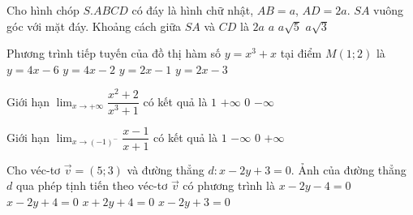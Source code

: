 \begin{ex}%
Cho hình chóp $S.ABCD$ có đáy là hình chữ nhật, $AB=a$, $AD=2a$. $SA$ vuông góc với mặt đáy. Khoảng cách giữa $SA$ và $CD$ là
\choice
{\True $2a$}
{$a$}
{$a\sqrt{5}$}
{$a\sqrt{3}$}
\end{ex}

\begin{ex}%
Phương trình tiếp tuyến của đồ thị hàm số $y=x^3+x$ tại điểm $M(1;2)$ là
\choice
{$y=4x-6$}
{\True $y=4x-2$}
{$y=2x-1$}
{$y=2x-3$}
\end{ex}

\begin{ex}%
Giới hạn $\displaystyle\lim_{x\to +\infty}\dfrac{x^2+2}{x^3+1}$ có kết quả là
\choice
{$1$}
{$+\infty$}
{\True $0$}
{$-\infty$}
\end{ex}

\begin{ex}%
Giới hạn $\displaystyle\lim_{x\to (-1)^-}\dfrac{x-1}{x+1}$ có kết quả là
\choice
{$1$}
{$-\infty$}
{$0$}
{\True $+\infty$}
\end{ex}

\begin{ex}%
Cho véc-tơ $\overrightarrow{v}=(5;3)$ và đường thẳng $d:x-2y+3=0$. Ảnh của đường thẳng $d$ qua phép tịnh tiến theo véc-tơ $\overrightarrow{v}$ có phương trình là
\choice
{$x-2y-4=0$}
{\True $x-2y+4=0$}
{$x+2y+4=0$}
{$x-2y+3=0$}
\end{ex}

